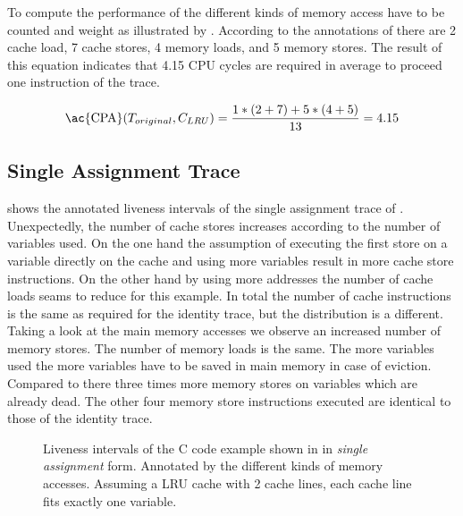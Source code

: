 \documentclass[onecolumn, openright, master, english, signatures]{dbrgrptt}
\begin{document}
To compute the performance of  the different kinds of memory access have to be counted and weight as illustrated by . According to the annotations of  there are 2 cache load, 7 cache stores, 4 memory loads, and 5 memory stores. The result of this equation indicates that 4.15 \ac{CPU} cycles are required in average to proceed one instruction of the \ac{trace}.

\begin{equation}\label{equ:trace-transformation-original-marked}
\text{\ac{CPA}}(T_{original}, C_{LRU}) = \frac{1 * (2 + 7) + 5 * (4 + 5)}{13} = 4.15
\end{equation}

\subsection{Single Assignment Trace}
 shows the annotated liveness intervals of the single assignment trace of . Unexpectedly, the number of cache stores increases according to the number of variables used. On the one hand the assumption of executing the first store on a variable directly on the cache and using more variables result in more cache store instructions. On the other hand by using more addresses the number of cache loads seams to reduce for this example. In total the number of cache instructions is the same as required for the identity \ac{trace}, but the distribution is a different. Taking a look at the main memory accesses we observe an increased number of memory stores. The number of memory loads is the same. The more variables used the more variables have to be saved in main memory in case of eviction. Compared to  there three times more memory stores on variables which are already dead. The other four memory store instructions executed are identical to those of the identity \ac{trace}.

\begin{figure}
  \centering
  
  \caption{Liveness intervals of the C code example shown in  in \emph{single assignment} form. Annotated by the different kinds of memory accesses. Assuming a \ac{LRU} cache with 2 cache lines, each cache line fits exactly one variable.}
  \label{fig:trace-transformation-sa-marked}
\end{figure}
\end{document}
